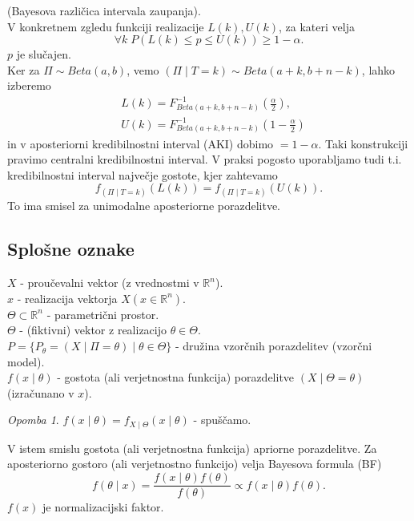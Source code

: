 \documentclass[a4paper, 12pt]{book}
\theoremstyle{definition}
\theoremstyle{remark}
\newtheorem*{rem}{Opomba}
\newcommand{\R}{\mathbb{R}}
\begin{document}
(Bayesova različica intervala zaupanja). \\
V konkretnem zgledu  funkciji realizacije $L(k), U(k)$, za kateri velja
\begin{equation*}
  \forall k \; P\left(L(k) \leq p \leq U(k)\right) \geq 1-\alpha.
\end{equation*}
$p$ je slučajen. \\
Ker za $\Pi \sim Beta(a,b)$, vemo $(\Pi \mid T=k) \sim Beta(a+k, b+n-k)$, lahko izberemo
\begin{align*}
  &L(k) = F_{Beta(a+k,b+n-k)}^{-1}\left(\frac{\alpha}{2}\right), \\
  &U(k) = F_{Beta(a+k,b+n-k)}^{-1}\left(1 - \frac{\alpha}{2}\right)
\end{align*}
in v aposteriorni kredibilnostni interval (AKI) dobimo $= 1 - \alpha$.
Taki konstrukciji pravimo centralni kredibilnostni interval.
V praksi pogosto uporabljamo tudi t.i. kredibilnostni interval največje gostote, kjer zahtevamo
\begin{equation*}
  f_{(\Pi \mid T=k)}(L(k)) = f_{(\Pi \mid T=k)}(U(k)).
\end{equation*}
To ima smisel za unimodalne aposteriorne porazdelitve.


\subsection{Splošne oznake}

$X$ - proučevalni vektor (z vrednostmi v $\R^n$). \\
$x$ - realizacija vektorja $X (x \in \R^n)$. \\
$\Theta \subset \R^n$ - parametrični prostor. \\
$\Theta$ - (fiktivni) vektor z realizacijo $\theta \in \Theta$. \\
$P = \{P_{\theta} = (X \mid \Pi = \theta) \mid \theta \in \Theta\}$ - družina vzorčnih porazdelitev (vzorčni model). \\
$f(x \mid \theta)$ - gostota (ali verjetnostna funkcija) porazdelitve $(X \mid \Theta = \theta)$
(izračunano v $x$). \\
\begin{rem}
  $f(x \mid \theta) = f_{X \mid \Theta}(x \mid \theta)$ - spuščamo.
\end{rem}
V istem smislu gostota (ali verjetnostna funkcija) apriorne porazdelitve.
Za aposteriorno gostoro (ali verjetnostno funkcijo) velja Bayesova formula (BF)
\begin{equation*}
  f(\theta \mid x) = \frac{f(x \mid \theta) f(\theta)}{f(\theta)} \propto f(x \mid \theta) f(\theta).
\end{equation*}
$f(x)$ je normalizacijski faktor.
\end{document}
